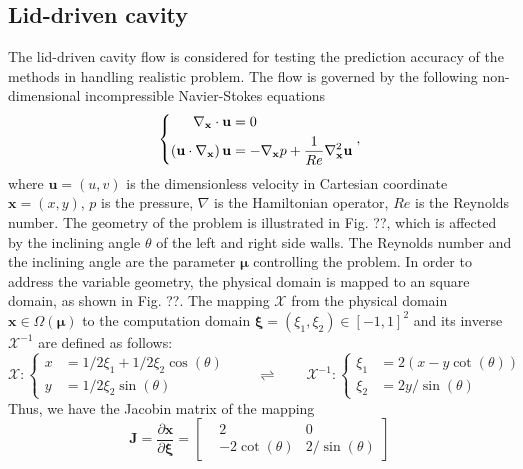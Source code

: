 \documentclass[preprint, 10pt]{elsarticle}
\begin{document}
\subsection{Lid-driven cavity}
The lid-driven cavity flow is considered for testing the prediction accuracy of the methods in handling realistic problem.
The flow is governed by the following non-dimensional incompressible Navier-Stokes equations
\begin{equation}
\left \{
\begin{aligned}
\nabla_{\mathbf{x}}  \cdot {\bf{u}} &= 0 \\
\left( {{\bf{u}} \cdot \nabla_{\mathbf{x}} } \right){\bf{u}} &=  - \nabla_{\mathbf{x}} p + \frac{1}{Re}{\nabla_{\mathbf{x}} ^2}{\bf{u}}
\end{aligned}
\right .
,
\label{eq_GoverningEqsLidDriven}
\end{equation}
where $\mathbf{u}=(u,v)$ is the dimensionless velocity in Cartesian coordinate $\mathbf{x}=(x,y)$, $p$ is the pressure, $\nabla$ is the  Hamiltonian operator, $Re$ is the Reynolds number.  The geometry of the problem is illustrated in Fig. ??, which is affected by  the inclining angle $\theta$ of the left and right side walls. The Reynolds number and the inclining angle are the parameter $\pmb {\mu} $ controlling the problem. In order to address the variable geometry, the physical domain  is mapped to an square domain, as shown in Fig. ??. The mapping $\mathcal{X}$ from the physical domain $\mathbf{x} \in \Omega\left(\pmb{\mu}\right)$ to the computation domain $\pmb{ \xi}=(\xi_1, \xi_2) \in [-1,1]^2$  and its inverse $\mathcal{X}^{-1}$ are defined as follows:
\begin{equation}
\mathcal{X}:
\left \{
\begin{aligned}
x &= 1/2 \xi_1 + 1/2 \xi_2 \cos(\theta)\\
y &= 1/2 \xi_2 \sin(\theta)
\end{aligned}
\right .
\qquad
\rightleftharpoons
\qquad
\mathcal{X}^{-1}:
\left \{
\begin{aligned}
\xi_1 &= 2(x-y \cot(\theta))\\
\xi_2 &= 2y/\sin(\theta)
\end{aligned}
\right .
\end{equation}
Thus, we have the Jacobin matrix of the mapping
\begin{equation}
\mathbf{J} = \frac{\partial \mathbf{x}}{\partial \pmb{\xi}}
           =
\begin{bmatrix}
 &2             & 0\\
 &-2\cot(\theta)&2/\sin(\theta)
\end{bmatrix}
\label{eq_JacLidDriven}
\end{equation}
\end{document}
